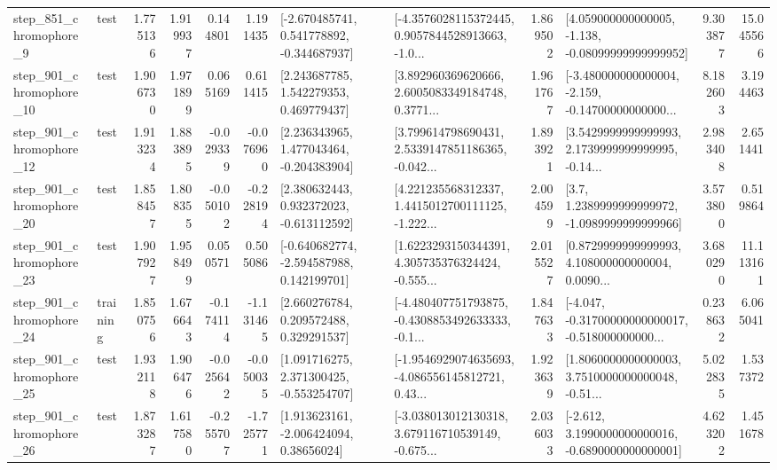 \begin{tabular}{llrrrrllrlrr}
   step\_851\_chromophore\_9 &      test &      1.775136 &    1.919937 &      0.144801 &  1.191435 &   [-2.670485741, 0.541778892, -0.344687937] &  [-4.3576028115372445, 0.9057844528913663, -1.0... &       1.869502 &  [4.059000000000005, -1.138, -0.08099999999999952] &            9.303877 &         15.045566 \\
  step\_901\_chromophore\_10 &      test &      1.906730 &    1.971899 &      0.065169 &  0.611415 &     [2.243687785, 1.542279353, 0.469779437] &  [3.892960369620666, 2.6005083349184748, 0.3771... &       1.961767 &  [-3.480000000000004, -2.159, -0.14700000000000... &            8.182603 &          3.194463 \\
  step\_901\_chromophore\_12 &      test &      1.913234 &    1.883895 &     -0.029339 & -0.076960 &    [2.236343965, 1.477043464, -0.204383904] &  [3.799614798690431, 2.5339147851186365, -0.042... &       1.893921 &  [3.5429999999999993, 2.1739999999999995, -0.14... &            2.983408 &          2.651441 \\
  step\_901\_chromophore\_20 &      test &      1.858457 &    1.808355 &     -0.050102 & -0.228194 &    [2.380632443, 0.932372023, -0.613112592] &  [4.221235568312337, 1.4415012700111125, -1.222... &       2.004599 &     [3.7, 1.2389999999999972, -1.0989999999999966] &            3.573800 &          0.519864 \\
  step\_901\_chromophore\_23 &      test &      1.907927 &    1.958499 &      0.050571 &  0.505086 &   [-0.640682774, -2.594587988, 0.142199701] &  [1.6223293150344391, 4.305735376324424, -0.555... &       2.015527 &  [0.8729999999999993, 4.108000000000004, 0.0090... &            3.680290 &         11.113161 \\
  step\_901\_chromophore\_24 &  training &      1.850756 &    1.676643 &     -0.174114 & -1.131465 &     [2.660276784, 0.209572488, 0.329291537] &  [-4.480407751793875, -0.4308853492633333, -0.1... &       1.847633 &  [-4.047, -0.31700000000000017, -0.518000000000... &            0.238632 &          6.065041 \\
  step\_901\_chromophore\_25 &      test &      1.932118 &    1.906476 &     -0.025642 & -0.050035 &    [1.091716275, 2.371300425, -0.553254707] &  [-1.9546929074635693, -4.086556145812721, 0.43... &       1.923639 &  [1.8060000000000003, 3.7510000000000048, -0.51... &            5.022835 &          1.537372 \\
  step\_901\_chromophore\_26 &      test &      1.873287 &    1.617580 &     -0.255707 & -1.725771 &     [1.913623161, -2.006424094, 0.38656024] &  [-3.038013012130318, 3.679116710539149, -0.675... &       2.036033 &  [-2.612, 3.1990000000000016, -0.6890000000000001] &            4.623202 &          1.451678 \\

\end{tabular}
